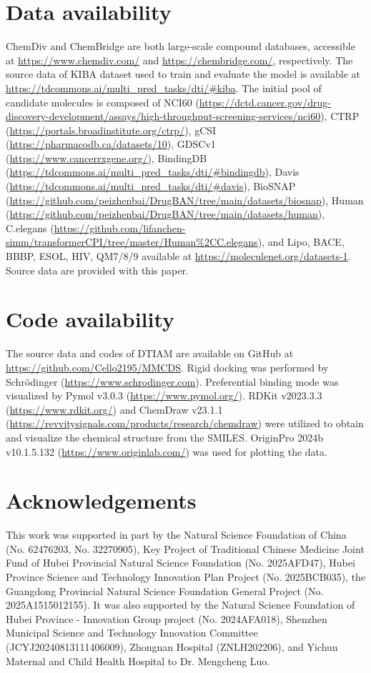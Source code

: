 \documentclass[unnumsec,webpdf,contemporary,large]{oup-authoring-template}%
\theoremstyle{thmstyleone}%
\theoremstyle{thmstyletwo}%
\theoremstyle{thmstylethree}%
\begin{document}
\section*{Data availability}

ChemDiv and ChemBridge are both large-scale compound databases, accessible at \url{https://www.chemdiv.com/} and \url{https://chembridge.com/}, respectively. The source data of KIBA dataset used to train and evaluate the model is available at \url{https://tdcommons.ai/multi_pred_tasks/dti/#kiba}. The initial pool of candidate molecules is composed of NCI60 (\url{https://dctd.cancer.gov/drug-discovery-development/assays/high-throughput-screening-services/nci60}), CTRP (\url{https://portals.broadinstitute.org/ctrp/}), gCSI (\url{https://pharmacodb.ca/datasets/10}), GDSCv1 (\url{https://www.cancerrxgene.org/}), BindingDB (\url{https://tdcommons.ai/multi_pred_tasks/dti/#bindingdb}), Davis (\url{https://tdcommons.ai/multi_pred_tasks/dti/#davis}), BioSNAP (\url{https://github.com/peizhenbai/DrugBAN/tree/main/datasets/biosnap}), Human (\url{https://github.com/peizhenbai/DrugBAN/tree/main/datasets/human}), C.elegans (\url{https://github.com/lifanchen-simm/transformerCPI/tree/master/Human%2CC.elegans}), and Lipo, BACE, BBBP, ESOL, HIV, QM7/8/9 available at \url{https://moleculenet.org/datasets-1}. Source data are provided with this paper.



\section*{Code availability}
The source data and codes of DTIAM are available on GitHub at \url{https://github.com/Cello2195/MMCDS}. Rigid docking was performed by Schrödinger (\url{https://www.schrodinger.com}). Preferential binding mode was visualized by Pymol v3.0.3 (\url{https://www.pymol.org/}). RDKit v2023.3.3 (\url{https://www.rdkit.org/}) and ChemDraw v23.1.1 (\url{https://revvitysignals.com/products/research/chemdraw}) were utilized to obtain and visualize the chemical structure from the SMILES. OriginPro 2024b v10.1.5.132 (\url{https://www.originlab.com/}) was used for plotting the data.


\section*{Acknowledgements}

This work was supported in part by the Natural Science Foundation of China (No. 62476203, No. 32270905), Key Project of Traditional Chinese Medicine Joint Fund of Hubei Provincial Natural Science Foundation (No. 2025AFD47), Hubei Province Science and Technology Innovation Plan Project (No. 2025BCB035), the Guangdong Provincial Natural Science Foundation General Project (No. 2025A1515012155). It was also supported by the Natural Science Foundation of Hubei Province - Innovation Group project (No. 2024AFA018), Shenzhen Municipal Science and Technology Innovation Committee (JCYJ20240813111406009), Zhongnan Hospital (ZNLH202206), and Yichun Maternal and Child Health Hospital to Dr. Mengcheng Luo.
\end{document}
